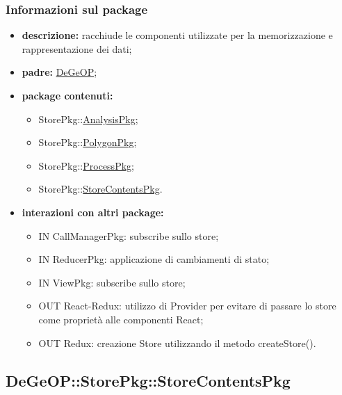 \subsubsection{Informazioni sul package}
\begin{itemize}
	\item \textbf{descrizione:} racchiude le componenti utilizzate per la memorizzazione e rappresentazione dei dati;
	\item \textbf{padre:} \hyperref[pkg::DeGeOP]{DeGeOP};
	\item \textbf{package contenuti:}
	\begin{itemize}
		\item StorePkg::\hyperref[pkg::AnalysisPkg]{AnalysisPkg};
		\item StorePkg::\hyperref[pkg::PolygonPkg]{PolygonPkg};
		\item StorePkg::\hyperref[pkg::ProcessPkg]{ProcessPkg};
		\item StorePkg::\hyperref[pkg::StoreContentsPkg]{StoreContentsPkg}.
	\end{itemize}
	\item \textbf{interazioni con altri package:} 
	\begin{itemize}
		\item IN CallManagerPkg: subscribe sullo store;
		\item IN ReducerPkg: applicazione di cambiamenti di stato;
		\item IN ViewPkg: subscribe sullo store;
		\item OUT React-Redux: utilizzo di Provider per evitare di passare lo store come proprietà alle componenti React;
		\item OUT Redux: creazione Store utilizzando il metodo createStore().
	\end{itemize}
\end{itemize}
\newpage
\subsection{DeGeOP::StorePkg::StoreContentsPkg}
\label{pkg::StoreContentsPkg}
